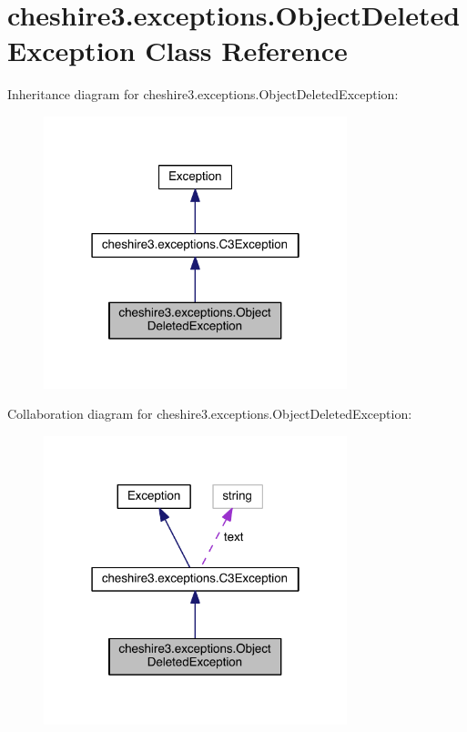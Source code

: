 \hypertarget{classcheshire3_1_1exceptions_1_1_object_deleted_exception}{\section{cheshire3.\-exceptions.\-Object\-Deleted\-Exception Class Reference}
\label{classcheshire3_1_1exceptions_1_1_object_deleted_exception}
}


Inheritance diagram for cheshire3.\-exceptions.\-Object\-Deleted\-Exception\-:
\nopagebreak
\begin{figure}[H]
\begin{center}
\leavevmode
\includegraphics[width=250pt]{classcheshire3_1_1exceptions_1_1_object_deleted_exception__inherit__graph}
\end{center}
\end{figure}


Collaboration diagram for cheshire3.\-exceptions.\-Object\-Deleted\-Exception\-:
\nopagebreak
\begin{figure}[H]
\begin{center}
\leavevmode
\includegraphics[width=250pt]{classcheshire3_1_1exceptions_1_1_object_deleted_exception__coll__graph}
\end{center}
\end{figure}
